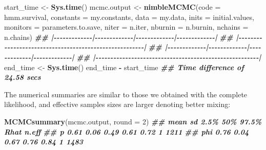 \documentclass[
  12pt,
]{krantz}
\newenvironment{Shaded}{\begin{snugshade}}{\end{snugshade}}
\newcommand{\AttributeTok}[1]{\textcolor[rgb]{0.13,0.29,0.53}{#1}}
\newcommand{\DecValTok}[1]{\textcolor[rgb]{0.00,0.00,0.81}{#1}}
\newcommand{\DocumentationTok}[1]{\textcolor[rgb]{0.56,0.35,0.01}{\textbf{\textit{#1}}}}
\newcommand{\FunctionTok}[1]{\textcolor[rgb]{0.13,0.29,0.53}{\textbf{#1}}}
\newcommand{\NormalTok}[1]{#1}
\newcommand{\OtherTok}[1]{\textcolor[rgb]{0.56,0.35,0.01}{#1}}
\newcommand{\SpecialCharTok}[1]{\textcolor[rgb]{0.81,0.36,0.00}{\textbf{#1}}}
\begin{document}
\begin{Shaded}
\begin{Highlighting}[]
\NormalTok{start\_time }\OtherTok{\textless{}{-}} \FunctionTok{Sys.time}\NormalTok{()}
\NormalTok{mcmc.output }\OtherTok{\textless{}{-}} \FunctionTok{nimbleMCMC}\NormalTok{(}\AttributeTok{code =}\NormalTok{ hmm.survival,}
                          \AttributeTok{constants =}\NormalTok{ my.constants,}
                          \AttributeTok{data =}\NormalTok{ my.data,}
                          \AttributeTok{inits =}\NormalTok{ initial.values,}
                          \AttributeTok{monitors =}\NormalTok{ parameters.to.save,}
                          \AttributeTok{niter =}\NormalTok{ n.iter,}
                          \AttributeTok{nburnin =}\NormalTok{ n.burnin,}
                          \AttributeTok{nchains =}\NormalTok{ n.chains)}
\DocumentationTok{\#\# |{-}{-}{-}{-}{-}{-}{-}{-}{-}{-}{-}{-}{-}|{-}{-}{-}{-}{-}{-}{-}{-}{-}{-}{-}{-}{-}|{-}{-}{-}{-}{-}{-}{-}{-}{-}{-}{-}{-}{-}|{-}{-}{-}{-}{-}{-}{-}{-}{-}{-}{-}{-}{-}|}
\DocumentationTok{\#\# |{-}{-}{-}{-}{-}{-}{-}{-}{-}{-}{-}{-}{-}{-}{-}{-}{-}{-}{-}{-}{-}{-}{-}{-}{-}{-}{-}{-}{-}{-}{-}{-}{-}{-}{-}{-}{-}{-}{-}{-}{-}{-}{-}{-}{-}{-}{-}{-}{-}{-}{-}{-}{-}{-}{-}|}
\DocumentationTok{\#\# |{-}{-}{-}{-}{-}{-}{-}{-}{-}{-}{-}{-}{-}|{-}{-}{-}{-}{-}{-}{-}{-}{-}{-}{-}{-}{-}|{-}{-}{-}{-}{-}{-}{-}{-}{-}{-}{-}{-}{-}|{-}{-}{-}{-}{-}{-}{-}{-}{-}{-}{-}{-}{-}|}
\DocumentationTok{\#\# |{-}{-}{-}{-}{-}{-}{-}{-}{-}{-}{-}{-}{-}{-}{-}{-}{-}{-}{-}{-}{-}{-}{-}{-}{-}{-}{-}{-}{-}{-}{-}{-}{-}{-}{-}{-}{-}{-}{-}{-}{-}{-}{-}{-}{-}{-}{-}{-}{-}{-}{-}{-}{-}{-}{-}|}
\NormalTok{end\_time }\OtherTok{\textless{}{-}} \FunctionTok{Sys.time}\NormalTok{()}
\NormalTok{end\_time }\SpecialCharTok{{-}}\NormalTok{ start\_time}
\DocumentationTok{\#\# Time difference of 24.58 secs}
\end{Highlighting}
\end{Shaded}

The numerical summaries are similar to those we obtained with the complete likelihood, and effective samples sizes are larger denoting better mixing:

\begin{Shaded}
\begin{Highlighting}[]
\FunctionTok{MCMCsummary}\NormalTok{(mcmc.output, }\AttributeTok{round =} \DecValTok{2}\NormalTok{)}
\DocumentationTok{\#\#     mean   sd 2.5\%  50\% 97.5\% Rhat n.eff}
\DocumentationTok{\#\# p   0.61 0.06 0.49 0.61  0.72    1  1211}
\DocumentationTok{\#\# phi 0.76 0.04 0.67 0.76  0.84    1  1483}
\end{Highlighting}
\end{Shaded}
\end{document}
